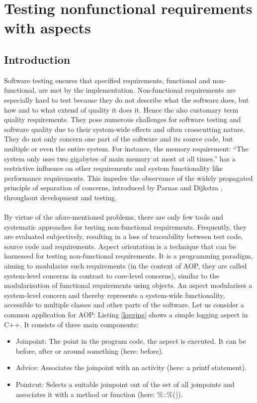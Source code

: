 \chapter{Testing nonfunctional requirements with aspects}\label{sec:topic_10}

\section{Introduction}

Software testing ensures that specified requirements, functional and non-functional, are met by the implementation. Non-functional requirements are especially hard to test because they do not describe what the software does, but how and to what extend of quality it does it. Hence the also customary term quality requirements. They pose numerous challenges for software testing and software quality due to their system-wide effects and often crosscutting nature. They do not only concern one part of the software and its source code, but multiple or even the entire system. For instance, the memory requirement: “The system only uses two gigabytes of main memory at most at all times.” has a restrictive influence on other requirements and system functionality like performance requirements. This impedes the observance of the widely propagated principle of separation of concerns, introduced by Parnas \cite{Parnas} and Dijkstra \cite{Dijkstra}, throughout development and testing.\\
\\
By virtue of the afore-mentioned problems, there are only few tools and systematic approaches for testing non-functional requirements. Frequently, they are evaluated subjectively, resulting in a loss of traceability between test code, source code and requirements. Aspect orientation is a technique that can be harnessed for testing non-functional requirements. It is a programming paradigm, aiming to modularise such requirements (in the context of AOP, they are called system-level concerns in contrast to core-level concerns), similar to the modularisation of functional requirements using objects. An aspect modularises a system-level concern and thereby represents a system-wide functionality, accessible to multiple classes and other parts of the software. Let us consider a common application for AOP: Listing \ref{logging} shows a simple logging aspect in C++. It consists of three main components:
\begin{itemize}
\item Joinpoint: The point in the program code, the aspect is executed. It can be before, after or around something (here: before).
\item Advice: Associates the joinpoint with an activity (here: a printf statement). 
\item Pointcut: Selects a suitable joinpoint out of the set of all joinpoints and associates it with a method or function (here: \%::\%()).
\end{itemize}

